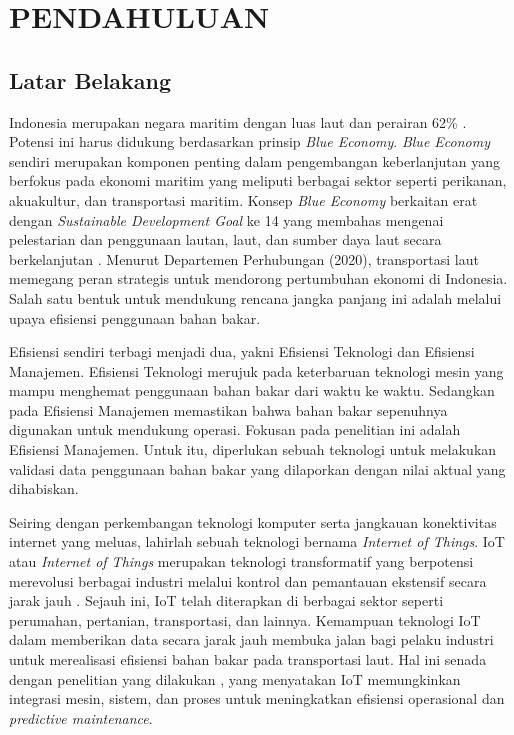 \chapter{PENDAHULUAN}

\section{Latar Belakang}

\noindent Indonesia merupakan negara maritim dengan luas laut dan perairan 62\% \parencite{inproc:wuryadani}. Potensi ini harus didukung berdasarkan prinsip \textit{Blue Economy}. \textit{Blue Economy} sendiri merupakan komponen penting dalam pengembangan keberlanjutan yang berfokus pada ekonomi maritim yang meliputi berbagai sektor seperti perikanan, akuakultur, dan transportasi maritim. Konsep \textit{Blue Economy} berkaitan erat dengan \textit{Sustainable Development Goal} ke 14 yang membahas mengenai pelestarian dan penggunaan lautan, laut, dan sumber daya laut secara berkelanjutan \parencite{misc:lse}. Menurut Departemen Perhubungan (2020), transportasi laut memegang peran strategis untuk mendorong pertumbuhan ekonomi di Indonesia. Salah satu bentuk untuk mendukung rencana jangka panjang ini adalah melalui upaya efisiensi penggunaan bahan bakar.

Efisiensi sendiri terbagi menjadi dua, yakni Efisiensi Teknologi dan Efisiensi Manajemen. Efisiensi Teknologi merujuk pada keterbaruan teknologi mesin yang mampu menghemat penggunaan bahan bakar dari waktu ke waktu. Sedangkan pada Efisiensi Manajemen memastikan bahwa bahan bakar sepenuhnya digunakan untuk mendukung operasi. Fokusan pada penelitian ini adalah Efisiensi Manajemen. Untuk itu, diperlukan sebuah teknologi untuk melakukan validasi data penggunaan bahan bakar yang dilaporkan dengan nilai aktual yang dihabiskan. 

Seiring dengan perkembangan teknologi komputer serta jangkauan konektivitas internet yang meluas, lahirlah sebuah teknologi bernama \textit{Internet of Things}. IoT atau \textit{Internet of Things} merupakan teknologi transformatif yang berpotensi merevolusi berbagai industri melalui kontrol dan pemantauan ekstensif secara jarak jauh \parencite{article:hercog}. Sejauh ini, IoT telah diterapkan di berbagai sektor seperti perumahan, pertanian, transportasi, dan lainnya. Kemampuan teknologi IoT dalam memberikan data secara jarak jauh membuka jalan bagi pelaku industri untuk merealisasi efisiensi bahan bakar pada transportasi laut. Hal ini senada dengan penelitian yang dilakukan \textcite{article:suciu}, yang menyatakan IoT memungkinkan integrasi mesin, sistem, dan proses untuk meningkatkan efisiensi operasional dan \textit{predictive maintenance}.

